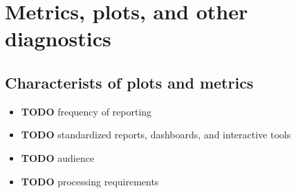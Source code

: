 \section{Metrics, plots, and other diagnostics}
\label{sec:org88abc15}
\subsection{Characterists of plots and metrics}
\label{sec:org2922d9c}
\begin{itemize}
\item {\bfseries\sffamily TODO} frequency of reporting
\label{sec:orgdce4b3f}
\item {\bfseries\sffamily TODO} standardized reports, dashboards, and interactive tools
\label{sec:org97e5a69}
\item {\bfseries\sffamily TODO} audience
\label{sec:org38c8a7e}
\item {\bfseries\sffamily TODO} processing requirements
\label{sec:org609d94c}
\end{itemize}
